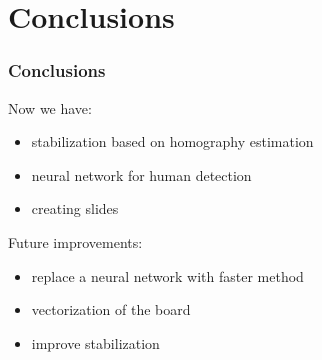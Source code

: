 \section{Conclusions}
\begin{frame}
  \frametitle{Conclusions}
    Now we have:
    \begin{itemize}
     \item stabilization based on homography estimation
     \item neural network for human detection
     \item creating slides
   \end{itemize}
   Future improvements:
   \begin{itemize}
     \item replace a neural network with faster method
     \item vectorization of the board
     \item improve stabilization
   \end{itemize}
\end{frame}
